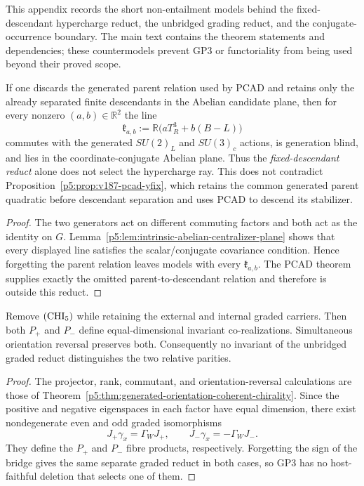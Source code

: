 \documentclass[11pt,a4paper]{article}
\begin{document}
This appendix records the short non-entailment models behind the
fixed-descendant hypercharge reduct, the unbridged grading reduct, and the
conjugate-occurrence boundary.  The main text
contains the theorem statements and dependencies; these countermodels prevent
GP3 or functoriality from being used beyond their proved scope.

\begin{proposition}
\label{p5:prop:hypercharge-ray-countermodel}
If one discards the generated parent relation used by PCAD and retains only
the already separated finite descendants in the Abelian candidate plane, then
for every nonzero \((a,b)\in\mathbb R^2\) the line
\[
\mathfrak k_{a,b}:=\mathbb R\bigl(aT_R^3+b(B-L)\bigr)
\]
commutes with the generated \(SU(2)_L\) and \(SU(3)_c\) actions, is generation
blind, and lies in the coordinate-conjugate Abelian plane.  Thus the
\emph{fixed-descendant reduct} alone does not select the hypercharge ray.  This
does not contradict Proposition~\ref{p5:prop:v187-pcad-yfix}, which retains
the common generated parent quadratic before descendant separation and uses
PCAD to descend its stabilizer.
\end{proposition}
\begin{proof}
The two generators act on different commuting factors and both act as the
identity on \(G\).  Lemma~\ref{p5:lem:intrinsic-abelian-centralizer-plane}
shows that every displayed line satisfies the scalar/conjugate covariance
condition.  Hence forgetting the parent relation leaves models with every
\(\mathfrak k_{a,b}\).  The PCAD theorem supplies exactly the omitted
parent-to-descendant relation and therefore is outside this reduct.
\end{proof}

\begin{proposition}
\label{p5:prop:relative-parity-countermodel}
Remove \(({\rm CHI}_5)\) while retaining the external and internal graded
carriers.  Then both \(P_+\) and \(P_-\) define equal-dimensional invariant
co-realizations.  Simultaneous orientation reversal preserves both.
Consequently no invariant of the unbridged graded reduct distinguishes the
two relative parities.
\end{proposition}

\begin{proof}
The projector, rank, commutant, and orientation-reversal calculations are
those of Theorem~\ref{p5:thm:generated-orientation-coherent-chirality}.  Since
the positive and negative eigenspaces in each factor have equal dimension,
there exist nondegenerate even and odd graded isomorphisms
\[
J_+\gamma_x=\Gamma_WJ_+,
\qquad
J_-\gamma_x=-\Gamma_WJ_-.
\]
They define the \(P_+\) and \(P_-\) fibre products, respectively.  Forgetting
the sign of the bridge gives the same separate graded reduct in both cases,
so GP3 has no host-faithful deletion that selects one of them.
\end{proof}
\end{document}
